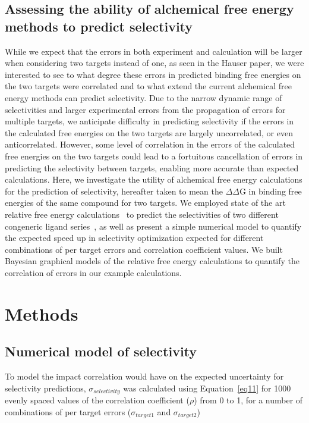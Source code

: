\documentclass[phd,tocprelim]{cornell}
\begin{document}
\subsection{Assessing the ability of alchemical free energy methods to predict selectivity}
While we expect that the errors in both experiment and calculation will be larger when considering two targets instead of one, as seen in the Hauser paper, we were interested to see to what degree these errors in predicted binding free energies on the two targets were correlated and to what extend the current alchemical free energy methods can predict selectivity. Due to the narrow dynamic range of selectivities and larger experimental errors from the propagation of errors for multiple targets, we anticipate difficulty in predicting selectivity if the errors in the calculated free energies on the two targets are largely uncorrelated, or even anticorrelated. However, some level of correlation in the errors of the calculated free energies on the two targets could lead to a fortuitous cancellation of errors in predicting the selectivity between targets, enabling more accurate than expected calculations. 
Here, we investigate the utility of alchemical free energy calculations for the prediction of selectivity, hereafter taken to mean the $\Delta \Delta$G in binding free energies of the same compound for two targets. We employed state of the art relative free energy calculations~\citep{Wang:J.Am.Chem.Soc.:2015,Abel:2017jt} to predict the selectivities of two different congeneric ligand series~\citep{Shao2013-oe, Blake2016-su}, as well as present a simple numerical model to quantify the expected speed up in selectivity optimization expected for different combinations of per target errors and correlation coefficient values. We built Bayesian graphical models of the relative free energy calculations to quantify the correlation of errors in our example calculations.   

\section{Methods}

\subsection{Numerical model of selectivity}
To model the impact correlation would have on the expected uncertainty for selectivity predictions, $\sigma_{selectivity}$ was calculated using Equation~\ref{eq11} for 1000 evenly spaced values of the correlation coefficient ($\rho$) from 0 to 1, for a number of combinations of per target errors ($\sigma_{target1}$ and $\sigma_{target2}$) 
\end{document}
